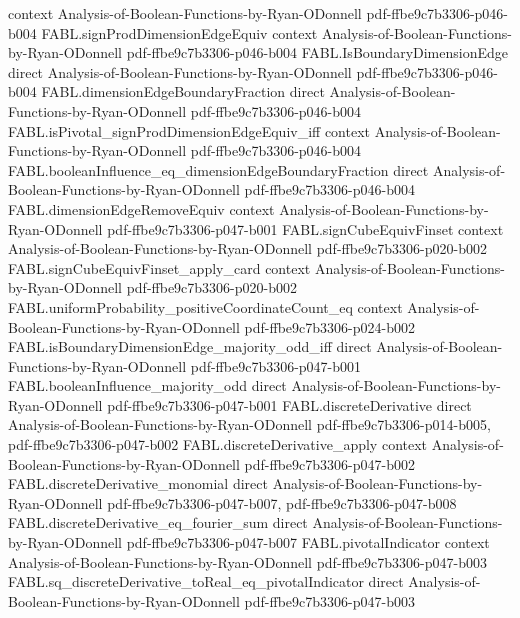 \begin{theorem}
  {context}
  {Analysis-of-Boolean-Functions-by-Ryan-ODonnell}
  {pdf-ffbe9c7b3306-p046-b004}
\proofstep
  {FABL.signProdDimensionEdgeEquiv}
  {context}
  {Analysis-of-Boolean-Functions-by-Ryan-ODonnell}
  {pdf-ffbe9c7b3306-p046-b004}
\proofstep
  {FABL.IsBoundaryDimensionEdge}
  {direct}
  {Analysis-of-Boolean-Functions-by-Ryan-ODonnell}
  {pdf-ffbe9c7b3306-p046-b004}
\proofstep
  {FABL.dimensionEdgeBoundaryFraction}
  {direct}
  {Analysis-of-Boolean-Functions-by-Ryan-ODonnell}
  {pdf-ffbe9c7b3306-p046-b004}
\proofstep
  {FABL.isPivotal_signProdDimensionEdgeEquiv_iff}
  {context}
  {Analysis-of-Boolean-Functions-by-Ryan-ODonnell}
  {pdf-ffbe9c7b3306-p046-b004}
\proofstep
  {FABL.booleanInfluence_eq_dimensionEdgeBoundaryFraction}
  {direct}
  {Analysis-of-Boolean-Functions-by-Ryan-ODonnell}
  {pdf-ffbe9c7b3306-p046-b004}
\proofstep
  {FABL.dimensionEdgeRemoveEquiv}
  {context}
  {Analysis-of-Boolean-Functions-by-Ryan-ODonnell}
  {pdf-ffbe9c7b3306-p047-b001}
\proofstep
  {FABL.signCubeEquivFinset}
  {context}
  {Analysis-of-Boolean-Functions-by-Ryan-ODonnell}
  {pdf-ffbe9c7b3306-p020-b002}
\proofstep
  {FABL.signCubeEquivFinset_apply_card}
  {context}
  {Analysis-of-Boolean-Functions-by-Ryan-ODonnell}
  {pdf-ffbe9c7b3306-p020-b002}
\proofstep
  {FABL.uniformProbability_positiveCoordinateCount_eq}
  {context}
  {Analysis-of-Boolean-Functions-by-Ryan-ODonnell}
  {pdf-ffbe9c7b3306-p024-b002}
\proofstep
  {FABL.isBoundaryDimensionEdge_majority_odd_iff}
  {direct}
  {Analysis-of-Boolean-Functions-by-Ryan-ODonnell}
  {pdf-ffbe9c7b3306-p047-b001}
\proofstep
  {FABL.booleanInfluence_majority_odd}
  {direct}
  {Analysis-of-Boolean-Functions-by-Ryan-ODonnell}
  {pdf-ffbe9c7b3306-p047-b001}
\proofstep
  {FABL.discreteDerivative}
  {direct}
  {Analysis-of-Boolean-Functions-by-Ryan-ODonnell}
  {pdf-ffbe9c7b3306-p014-b005,
    pdf-ffbe9c7b3306-p047-b002}
\proofstep
  {FABL.discreteDerivative_apply}
  {context}
  {Analysis-of-Boolean-Functions-by-Ryan-ODonnell}
  {pdf-ffbe9c7b3306-p047-b002}
\proofstep
  {FABL.discreteDerivative_monomial}
  {direct}
  {Analysis-of-Boolean-Functions-by-Ryan-ODonnell}
  {pdf-ffbe9c7b3306-p047-b007,
    pdf-ffbe9c7b3306-p047-b008}
\proofstep
  {FABL.discreteDerivative_eq_fourier_sum}
  {direct}
  {Analysis-of-Boolean-Functions-by-Ryan-ODonnell}
  {pdf-ffbe9c7b3306-p047-b007}
\proofstep
  {FABL.pivotalIndicator}
  {context}
  {Analysis-of-Boolean-Functions-by-Ryan-ODonnell}
  {pdf-ffbe9c7b3306-p047-b003}
\proofstep
  {FABL.sq_discreteDerivative_toReal_eq_pivotalIndicator}
  {direct}
  {Analysis-of-Boolean-Functions-by-Ryan-ODonnell}
  {pdf-ffbe9c7b3306-p047-b003}

\end{theorem}
